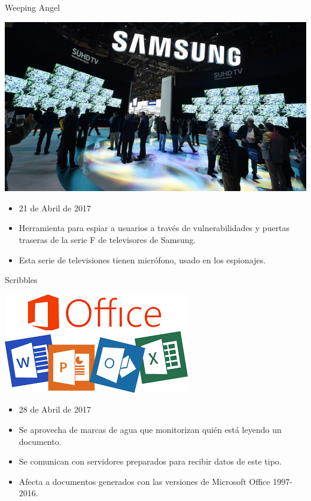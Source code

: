 \documentclass[10pt]{beamer}
\begin{document}
\begin{frame}{Weeping Angel}
	\pause
	\begin{center}
		\includegraphics[scale=1.2]{./Imagenes/weeping-angel.jpg}
	\end{center}
	\pause
	\begin{itemize}
		\item 21 de Abril de 2017
		\pause
		\item Herramienta para espiar a usuarios a través de vulnerabilidades y puertas traseras de la serie F de televisores de Samsung.
		\pause
		\item Esta serie de televisiones tienen micrófono, usado en los espionajes.
	\end{itemize}
\end{frame}

\begin{frame}{Scribbles}
	\pause
	\begin{center}
		\includegraphics[scale=0.5]{./Imagenes/scribbles.png}
	\end{center}
	\pause
	\begin{itemize}
		\item 28 de Abril de 2017
		\pause
		\item Se aprovecha de marcas de agua que monitorizan quién está leyendo un documento.
		\pause
		\item Se comunican con servidores preparados para recibir datos de este tipo.
		\pause
		\item Afecta a documentos generados con las versiones de Microsoft Office 1997-2016.
	\end{itemize}
\end{frame}
\end{document}
